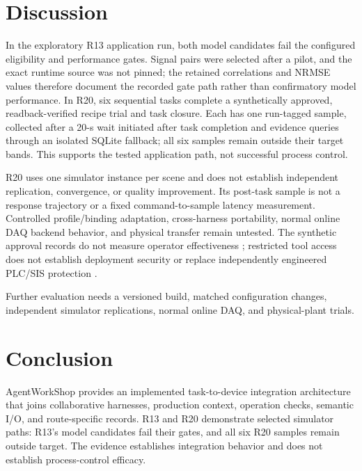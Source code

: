 \section{Discussion}
\label{sec:limits}
In the exploratory R13 application run, both model candidates fail the
configured eligibility and performance gates. Signal pairs were selected
after a pilot, and the exact runtime source was not pinned; the retained
correlations and NRMSE values therefore document the recorded gate path rather
than confirmatory model performance. In R20, six sequential tasks complete a
synthetically approved, readback-verified recipe trial and task closure. Each
has one run-tagged sample, collected after a 20-s wait initiated after task
completion and evidence queries through an isolated SQLite fallback; all six
samples remain outside their target bands. This supports the tested
application path, not successful process control.

R20 uses one simulator instance per scene and does not establish independent
replication, convergence, or quality improvement. Its post-task sample is not
a response trajectory or a fixed command-to-sample latency measurement.
Controlled profile/binding adaptation, cross-harness portability, normal
online DAQ backend behavior, and physical transfer remain untested. The
synthetic approval records do not measure operator effectiveness
\cite{parasuramanmanzey2010complacency,parasuraman2000model,bainbridge1983ironies};
restricted tool access does not establish deployment security
\cite{greshake2023injection,liu2024pinjection,iec62443-3-3} or replace
independently engineered PLC/SIS protection \cite{iec61511}.

Further evaluation needs a versioned build, matched configuration changes,
independent simulator replications, normal online DAQ, and physical-plant
trials.

\section{Conclusion}
\label{sec:conclusion}
AgentWorkShop provides an implemented task-to-device integration architecture
that joins collaborative harnesses, production context, operation checks,
semantic I/O, and route-specific records. R13 and R20 demonstrate selected
simulator paths: R13's model candidates fail their gates, and all six R20
samples remain outside target. The evidence establishes integration behavior
and does not establish process-control efficacy.
